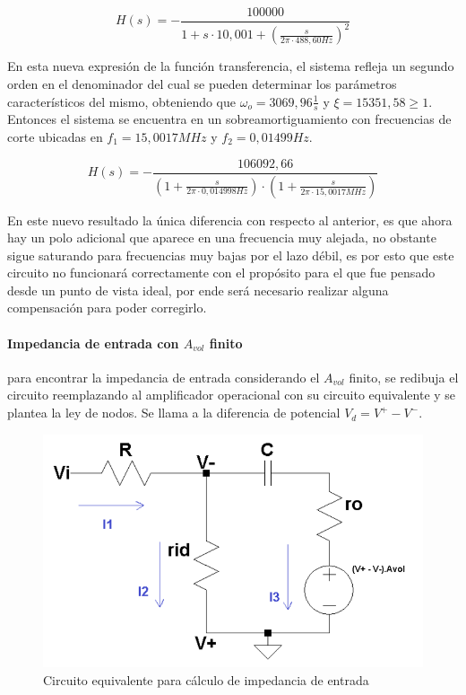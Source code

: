 \begin{equation*}
	H(s) = - \frac{100000}{1 + s \cdot 10,001 + \left( \frac{s}{2 \pi \cdot 488,60Hz} \right)^{2}}
\end{equation*}

En esta nueva expresi\'on de la funci\'on transferencia, el sistema refleja un segundo orden en el denominador del cual se pueden determinar los par\'ametros caracter\'isticos del mismo, obteniendo que $\omega_o = 3069,96 \frac{1}{s}$ y $\xi = 15351,58 \geq 1$. Entonces el sistema se encuentra en un sobreamortiguamiento con frecuencias de corte ubicadas en $f_1 = 15,0017MHz$ y $f_2 = 0,01499Hz$.

\begin{equation}
	H(s) = - \frac{106092,66}{(1 + \frac{s}{2 \pi \cdot 0,014998Hz}) \cdot (1 + \frac{s}{2 \pi \cdot 15,0017MHz})}
	\label{eq:integrador_transfer_polo_dominante}
\end{equation}

En este nuevo resultado la \'unica diferencia con respecto al anterior, es que ahora hay un polo adicional que aparece en una frecuencia muy alejada, no obstante sigue saturando para frecuencias muy bajas por el lazo d\'ebil, es por esto que este circuito no funcionar\'a correctamente con el prop\'osito para el que fue pensado desde un punto de vista ideal, por ende ser\'a necesario realizar alguna compensaci\'on para poder corregirlo.

\paragraph*{Impedancia de entrada con $A_{vol}$ finito} para encontrar la impedancia de entrada considerando el $A_{vol}$ finito, se redibuja el circuito reemplazando al amplificador operacional con su circuito equivalente y se plantea la ley de nodos.
Se llama a la diferencia de potencial $V_d = V^{+} - V^{-}$.

\begin{figure}[H]
	\centering
	\includegraphics[scale=0.7]{../EJ4/Recursos/Integrador/Circuito_integrador_modelo_impedancia.png}
	\caption{Circuito equivalente para c\'alculo de impedancia de entrada}
	\label{fig:integrador_modelo}
\end{figure}

